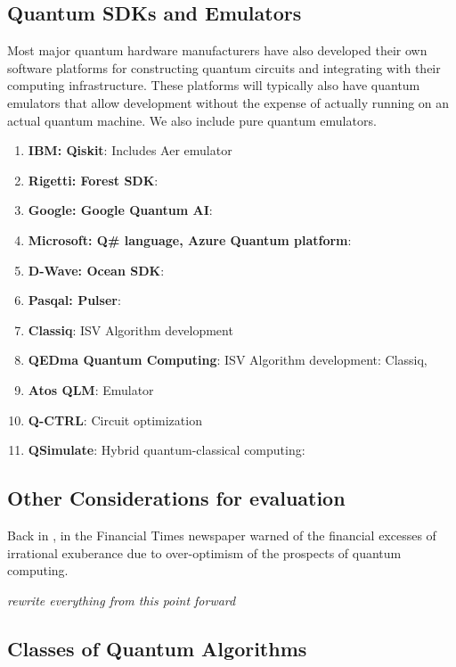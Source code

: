 \subsection{Quantum SDKs and Emulators}

Most major quantum hardware manufacturers have also developed their own software platforms for constructing quantum
circuits and integrating with their computing infrastructure.
These platforms will typically also have quantum emulators that allow development without the expense of actually
running on an actual quantum machine.
We also include pure quantum emulators.

\begin{enumerate}
\item \textbf{IBM: Qiskit}: Includes Aer emulator
\item \textbf{Rigetti: Forest SDK}:
\item \textbf{Google: Google Quantum AI}:
\item \textbf{Microsoft: Q\# language, Azure Quantum platform}:
\item \textbf{D-Wave: Ocean SDK}:
\item \textbf{Pasqal: Pulser}:
\item \textbf{Classiq}: ISV Algorithm development
\item \textbf{QEDma Quantum Computing}: ISV Algorithm development: Classiq, 
\item \textbf{Atos QLM}: Emulator
\item \textbf{Q-CTRL}: Circuit optimization
\item \textbf{QSimulate}: Hybrid quantum-classical computing: 
\end{enumerate}


\subsection{Other Considerations for evaluation}

Back in \citeyear{Ft:Gourianov:2022} \citeauthor{Ft:Gourianov:2022}, in the Financial Times newspaper \cite{Ft:Gourianov:2022}
warned of the financial excesses of irrational exuberance due to over-optimism of the prospects of quantum computing.  

\emph{rewrite everything from this point forward}

\subsection{Classes of Quantum Algorithms}

